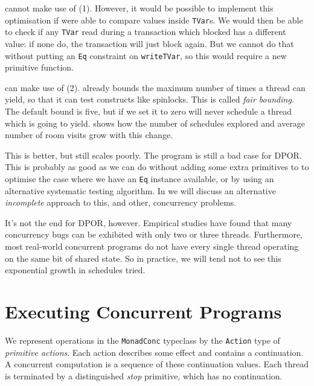 \dejafu{} cannot make use of (1).  However, it would be possible to
implement this optimisation if \dejafu{} were able to compare values
inside \verb|TVar|s.  We would then be able to check if any
\verb|TVar| read during a transaction which blocked has a different
value: if none do, the transaction will just block again.  But we
cannot do that without putting an \verb|Eq| constraint on
\verb|writeTVar|, so this would require a new primitive function.

\dejafu{} can make use of (2).  \dejafu{} already bounds the maximum
number of times a thread can yield, so that it can test constructs
like spinlocks.  This is called \emph{fair bounding}.  The default
bound is five, but if we set it to zero \dejafu{} will never schedule
a thread which is going to yield.   shows how the
number of schedules explored and average number of room visits grow
with this change.

This is better, but still scales poorly.  The program is still a bad
case for DPOR.  This is probably as good as we can do without adding
some extra primitives to \dejafu{} to optimise the case where we have
an \verb|Eq| instance available, or by using an alternative systematic
testing algorithm.  In  we will discuss an
alternative \emph{incomplete} approach to this, and other, concurrency
problems.

It's not the end for DPOR, however.  Empirical
studies\cite{thomson2014} have found that many concurrency bugs can be
exhibited with only two or three threads.  Furthermore, most
real-world concurrent programs do not have every single thread
operating on the same bit of shared state.  So in practice, we will
tend not to see this exponential growth in schedules tried.

\section{Executing Concurrent Programs}
\label{sec:dejafu-execution}

We represent operations in the \verb|MonadConc| typeclass by the
\verb|Action| type of \emph{primitive actions}.  Each action describes
some effect and contains a continuation.  A concurrent computation is
a sequence of these continuation values.  Each thread is terminated by
a distinguished \emph{stop} primitive, which has no continuation.

\FloatBarrier

